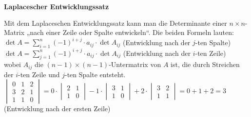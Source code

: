 \textbf{Laplacescher Entwicklungssatz}

Mit dem Laplaceschen Entwicklungssatz kann man die Determinante einer $n \times n$-Matrix „nach einer Zeile oder Spalte entwickeln“. Die beiden Formeln lauten:\\
$\det A = \sum_{i=1}^n (-1)^{i+j} \cdot a_{ij} \cdot \det A_{ij}$ (Entwicklung nach der $j$-ten Spalte)\\
$\det A = \sum_{j=1}^n (-1)^{i+j} \cdot a_{ij} \cdot \det A_{ij}$ (Entwicklung nach der $i$-ten Zeile)\\
wobei $A_{ij}$ die $(n-1) \times (n-1)$-Untermatrix von $A$ ist, die durch Streichen der $i$-ten Zeile und $j$-ten Spalte entsteht.
$
 \begin{vmatrix}
 0 & 1 & 2 \\
 3 & 2 & 1 \\
 1 & 1 & 0
 \end{vmatrix}
 =
 0 \cdot
 \begin{vmatrix}
 2 & 1 \\
 1 & 0
 \end{vmatrix}
 -1 \cdot
 \begin{vmatrix}
 3 & 1 \\
 1 & 0
 \end{vmatrix}
 +2 \cdot
 \begin{vmatrix}
 3 & 2 \\
 1 & 1
 \end{vmatrix}
 = 0 + 1 + 2
 = 3
$
(Entwicklung nach der ersten Zeile)\\

